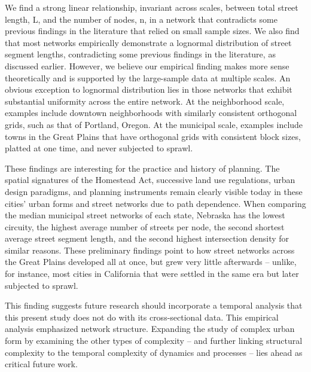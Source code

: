 \documentclass[Afour,sageh,times]{sage/sagej}
\begin{document}
We find a strong linear relationship, invariant across scales, between total street length, L, and the number of nodes, n, in a network that contradicts some previous findings in the literature that relied on small sample sizes. We also find that most networks empirically demonstrate a lognormal distribution of street segment lengths, contradicting some previous findings in the literature, as discussed earlier. However, we believe our empirical finding makes more sense theoretically and is supported by the large-sample data at multiple scales. An obvious exception to lognormal distribution lies in those networks that exhibit substantial uniformity across the entire network. At the neighborhood scale, examples include downtown neighborhoods with similarly consistent orthogonal grids, such as that of Portland, Oregon. At the municipal scale, examples include towns in the Great Plains that have orthogonal grids with consistent block sizes, platted at one time, and never subjected to sprawl. 

These findings are interesting for the practice and history of planning. The spatial signatures of the Homestead Act, successive land use regulations, urban design paradigms, and planning instruments remain clearly visible today in these cities' urban forms and street networks due to path dependence. When comparing the median municipal street networks of each state, Nebraska has the lowest circuity, the highest average number of streets per node, the second shortest average street segment length, and the second highest intersection density for similar reasons. These preliminary findings point to how street networks across the Great Plains developed all at once, but grew very little afterwards – unlike, for instance, most cities in California that were settled in the same era but later subjected to sprawl. 

This finding suggests future research should incorporate a temporal analysis that this present study does not do with its cross-sectional data. This empirical analysis emphasized network structure. Expanding the study of complex urban form by examining the other types of complexity – and further linking structural complexity to the temporal complexity of dynamics and processes – lies ahead as critical future work. 
\end{document}
